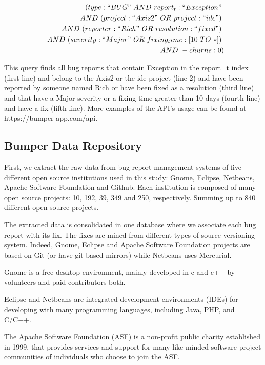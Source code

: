 \documentclass[conference]{IEEEtran}
\begin{document}
\begin{equation}
\begin{split}
  (type:``BUG"~AND~report_t:``Exception"~\\
~~AND~(project:``Axis2"~OR~project:``ide")~\\
~~AND~(reporter:``Rich"~OR~resolution:``fixed")~\\
~~AND~(severity:``Major"~OR~fixing_time:[10~TO~*])~\\
~~AND~-churns:0)
\end{split}
\end{equation}

This query finds all bug reports that contain Exception in the
report\_t index (first line) and belong to the Axis2 or the ide
project (line 2) and have been reported by someone named Rich
or have been fixed as a resolution (third line) and that have a
Major severity or a fixing time greater than 10 days (fourth line)
and have a fix (fifth line).
More examples of the API's usage can
be found at https://bumper-app.com/api.


\subsection{Bumper Data Repository}
\label{sub:Bumper Data Repository}

First, we extract the raw data from bug report management systems of five different open source institutions used in this study: Gnome, Eclipse, Netbeans, Apache Software Foundation and Github.
Each institution is composed of many open source projects: 10, 192, 39, 349 and 250, respectively. Summing up to 840 different open source projects.

The extracted data is consolidated in one database where we associate each bug report with its fix.
The fixes are mined from different types of source versioning system.
Indeed, Gnome, Eclipse and Apache Software Foundation projects are based on Git (or have git based mirrors) while Netbeans uses Mercurial.

Gnome is a free desktop environment, mainly developed in c and c++ by volunteers and paid contributors both.

Eclipse and Netbeans are integrated development environments (IDEs) for developing with many programming languages, including Java, PHP, and C/C++.

The Apache Software Foundation (ASF) is a non-profit public charity established in 1999, that provides services and support for many like-minded software project communities of individuals who choose to join the ASF.
\end{document}
